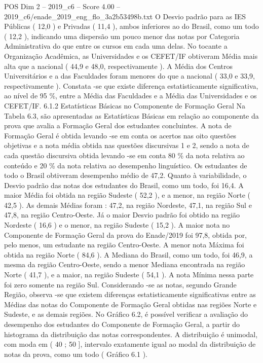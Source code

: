 \begin{textsample}{POS Dim 2 – 2019\_c6 – Score 4.00 – 2019\_c6/enade\_2019\_eng\_flo\_3a2b53498b.txt}
O Desvio padrão para as IES Públicas ( 12,0 ) e Privadas ( 11,4 ), ambos inferiores ao do Brasil, como um todo ( 12,2 ), indicando uma dispersão um pouco menor das notas por Categoria Administrativa do que entre os cursos em cada uma delas.
No tocante a Organização Acadêmica, as Universidades e os CEFET/IF obtiveram Média mais alta que a nacional ( 44,9 e 48,0, respectivamente ).
A Média dos Centros Universitários e a das Faculdades foram menores do que a nacional ( 33,0 e 33,9, respectivamente ).
Constata -se que existe diferença estatisticamente significativa, ao nível de 95 \%, entre a Média das Faculdades e a Média das Universidades e os CEFET/IF. 6.1.2 Estatísticas Básicas no Componente de Formação Geral Na Tabela 6.3, são apresentadas as Estatísticas Básicas em relação ao componente da prova que avalia a Formação Geral dos estudantes concluintes.
A nota de Formação Geral é obtida levando -se em conta os acertos nas oito questões objetivas e a nota média obtida nas questões discursivas 1 e 2, sendo a nota de cada questão discursiva obtida levando -se em conta 80 \% da nota relativa ao conteúdo e 20 \% da nota relativa ao desempenho linguístico.
Os estudantes de todo o Brasil obtiveram desempenho médio de 47,2.
Quanto à variabilidade, o Desvio padrão das notas dos estudantes do Brasil, como um todo, foi 16,4.
A maior Média foi obtida na região Sudeste ( 52,2 ), e a menor, na região Norte ( 42,5 ).
As demais Médias foram : 47,2, na região Nordeste, 47,1, na região Sul e 47,8, na região Centro-Oeste.
Já o maior Desvio padrão foi obtido na região Nordeste ( 16,6 ) e o menor, na região Sudeste ( 15,2 ).
A maior nota no Componente de Formação Geral da prova do Enade/2019 foi 97,8, obtida por, pelo menos, um estudante na região Centro-Oeste.
A menor nota Máxima foi obtida na região Norte ( 84,6 ).
A Mediana do Brasil, como um todo, foi 46,9, a mesma da região Centro-Oeste, sendo a menor Mediana encontrada na região Norte ( 41,7 ), e a maior, na região Sudeste ( 54,1 ).
A nota Mínima nessa parte foi zero somente na região Sul.
Considerando -se as notas, segundo Grande Região, observa -se que existem diferenças estatisticamente significativas entre as Médias das notas do Componente de Formação Geral obtidas nas regiões Norte e Sudeste, e as demais regiões.
No Gráfico 6.2, é possível verificar a avaliação do desempenho dos estudantes do Componente de Formação Geral, a partir do histograma da distribuição das notas correspondentes.
A distribuição é unimodal, com moda em ( 40 ; 50 ], intervalo exatamente igual ao modal da distribuição de notas da prova, como um todo ( Gráfico 6.1 ).

\end{textsample}

